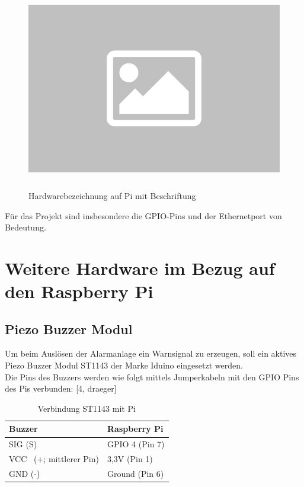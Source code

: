 \documentclass[12pt,a4paper,openany]{scrbook}
\begin{document}
	\begin{figure}[!h]
		\centering
		\includegraphics[height=250pt]{img/platzhalter}
		\caption{Hardwarebezeichnung auf Pi mit Beschriftung}
		\label{Bildlabel}
	\end{figure}
Für das Projekt sind insbesondere die GPIO-Pins und der Ethernetport von Bedeutung.\\

  

\section{Weitere Hardware im Bezug auf den Raspberry Pi}
\subsection{Piezo Buzzer Modul}
	Um beim Auslösen der Alarmanlage ein Warnsignal zu erzeugen, soll ein aktives Piezo Buzzer Modul ST1143 der Marke Iduino eingesetzt werden.\\ Die Pins des Buzzers werden wie folgt mittels Jumperkabeln mit den GPIO Pins des Pis verbunden: [4, draeger]
	
	\begin{table}[!h]
		\centering
		\begin{tabular}{|p{5cm}|p{5cm}|} 
			\hline
			Buzzer & Raspberry Pi  \\ 
			\hline
			SIG (S)   & GPIO 4 \hspace{0,1cm}(Pin 7)\\  
			\hline
			VCC~ ($+$; mittlerer Pin)   & 3,3V 	\hspace{0,7cm}(Pin 1)         \\ 
			\hline
			GND (-)    & Ground  	\hspace{0,2cm}(Pin 6)         \\
			\hline
		\end{tabular}
	\caption{Verbindung ST1143 mit Pi}
	\end{table} 
\end{document}
